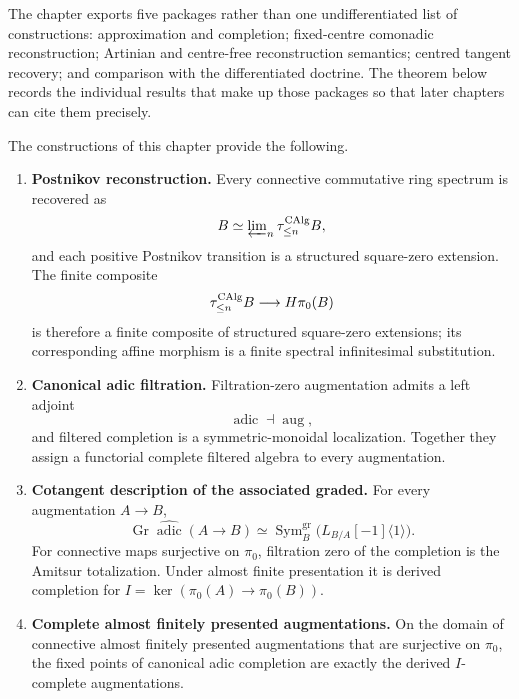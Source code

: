 The chapter exports five packages rather than one undifferentiated list of
constructions: approximation and completion; fixed-centre comonadic reconstruction;
Artinian and centre-free reconstruction semantics; centred tangent recovery; and
comparison with the differentiated doctrine. The theorem below records the individual
results that make up those packages so that later chapters can cite them precisely.

\begin{theorem}
\label{thm:formal-reconstruction-interface}
The constructions of this chapter provide the following.
\begin{enumerate}[label=(\roman*)]
    \item \textbf{Postnikov reconstruction.}
    Every connective commutative ring spectrum is recovered as
    \[
        B\simeq\varprojlim\nolimits_n\tau_{\leq n}^{\operatorname{CAlg}}B,
    \]
    and each positive Postnikov transition is a structured square-zero
    extension. The finite composite
    \[
        \tau_{\leq n}^{\operatorname{CAlg}}B\longrightarrow H\pi_0(B)
    \]
    is therefore a finite composite of structured square-zero extensions; its
    corresponding affine morphism is a finite spectral infinitesimal substitution.

    \item \textbf{Canonical adic filtration.}
    Filtration-zero augmentation admits a left adjoint
    \[
        \operatorname{adic}\dashv\operatorname{aug},
    \]
    and filtered completion is a symmetric-monoidal localization. Together
    they assign a functorial complete filtered algebra to every augmentation.

    \item \textbf{Cotangent description of the associated graded.}
    For every augmentation \(A\to B\),
    \[
        \operatorname{Gr}
        \widehat{\operatorname{adic}}(A\to B)
        \simeq
        \operatorname{Sym}^{\mathrm{gr}}_B
        \bigl(L_{B/A}[-1]\langle1\rangle\bigr).
    \]
    For connective maps surjective on \(\pi_0\), filtration zero of the
    completion is the Amitsur totalization. Under almost finite
    presentation it is derived completion for
    \(I=\ker(\pi_0(A)\to\pi_0(B))\).

    \item \textbf{Complete almost finitely presented augmentations.}
    On the domain of connective almost finitely presented augmentations that are surjective on \(\pi_0\), the fixed
    points of canonical adic completion are exactly the derived
    \(I\)-complete augmentations.


\end{enumerate}
\end{theorem}
